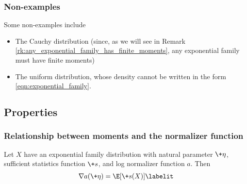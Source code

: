\documentclass{article} %
\newcommand{\logNormalizerFunction}{a}
\newcommand{\sufficientStatsFunction}{\+s}
\newcommand{\naturalParam}{\+\eta}
\begin{document}
\subsubsection{Non-examples}

Some non-examples include 
\begin{itemize}
\item The Cauchy distribution (since, as we will see in Remark \ref{rk:any_exponential_family_has_finite_moments}, any exponential family must have finite moments)
\item The uniform distribution, whose density cannot be written in the form \eqref{eqn:exponential_family}. %
\end{itemize}


\subsection{Properties}

\subsubsection{Relationship between moments and the normalizer function} \label{sec:relationship_between_moments_and_normalizer}

\begin{proposition}
Let $X$ have an exponential family distribution with natural parameter $\naturalParam$, sufficient statistics function $\sufficientStatsFunction$, and log normalizer function $\logNormalizerFunction$.   Then  
\begin{align*}
\nabla \logNormalizerFunction(\naturalParam) = \E[\sufficientStatsFunction(X)] 
\labelit \label{eqn:expected_sufficient_statistic_as_derivative_of_log_normalizer}	
\end{align*}
\label{prop:expected_sufficient_statistic_as_derivative_of_log_normalizer}
\end{proposition}
\end{document}
